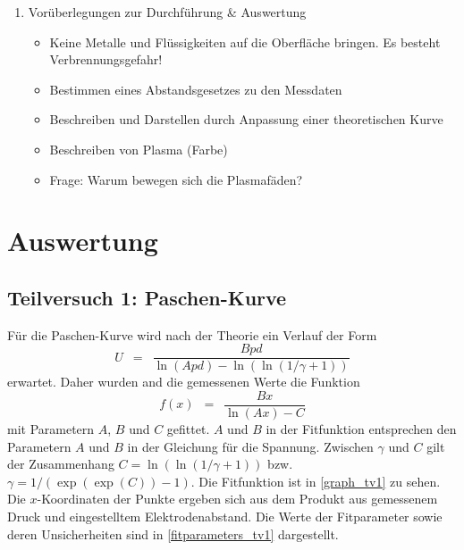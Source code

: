 \documentclass{article}
\newcommand{\widespace}{\enspace}
\newcommand{\wideeq}{\widespace = \widespace}
\begin{document}
\begin{enumerate}[label = (\Roman*)]
    \item Vorüberlegungen zur Durchführung \& Auswertung
        \begin{itemize}
            \item Keine Metalle und Flüssigkeiten auf die Oberfläche bringen. Es besteht Verbrennungsgefahr!
            \item Bestimmen eines Abstandsgesetzes zu den Messdaten
            \item Beschreiben und Darstellen durch Anpassung einer theoretischen Kurve
            \item Beschreiben von Plasma (Farbe)
            \item Frage: Warum bewegen sich die Plasmafäden?
        \end{itemize}
        
\end{enumerate}

\newpage

\section{Auswertung}

\subsection{Teilversuch 1: Paschen-Kurve}

Für die Paschen-Kurve wird nach der Theorie ein Verlauf der Form
\[
    U \wideeq \frac{Bpd}{\ln(Apd) - \ln(\ln(1 / \gamma + 1))}
\]
erwartet. Daher wurden and die gemessenen Werte die Funktion
\[
    f(x) \wideeq \frac{B x}{\ln(A x) - C}
\]
mit Parametern $A$, $B$ und $C$ gefittet.
$A$ und $B$ in der Fitfunktion entsprechen den Parametern $A$ und $B$ in der
Gleichung für die Spannung. Zwischen $\gamma$ und $C$ gilt der Zusammenhang
$C = \ln(\ln(1 / \gamma + 1))$ bzw. $\gamma = 1 / (\exp(\exp(C)) - 1)$.
Die Fitfunktion ist in \ref{graph_tv1} zu sehen. Die $x$-Koordinaten der Punkte
ergeben sich aus dem Produkt aus gemessenem Druck und
eingestelltem Elektrodenabstand.
Die Werte der Fitparameter sowie deren Unsicherheiten sind in
\ref{fitparameters_tv1} dargestellt.
\end{document}
